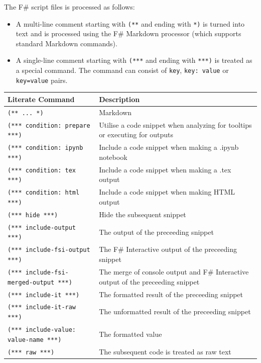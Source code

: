 \documentclass{article}
\begin{document}
The F\# script files is processed as follows:
\begin{itemize}
\item 

A multi-line comment starting with \texttt{(**} and ending with \texttt{*)} is
turned into text and is processed using the F\# Markdown processor
(which supports standard Markdown commands).

\item 

A single-line comment starting with \texttt{(***} and ending with \texttt{***)}
is treated as a special command. The command can consist of
\texttt{key}, \texttt{key: value} or \texttt{key=value} pairs.

\end{itemize}

\begin{tabular}{|l|l|}\hline
\textbf{Literate Command} & \textbf{Description}\\ \hline\hline
\texttt{(** ... *)} & Markdown\\ \hline
\texttt{(*** condition: prepare ***)} & Utilise a code snippet when analyzing for tooltips or executing for outputs\\ \hline
\texttt{(*** condition: ipynb ***)} & Include a code snippet when making a .ipynb notebook\\ \hline
\texttt{(*** condition: tex ***)} & Include a code snippet when making a .tex output\\ \hline
\texttt{(*** condition: html ***)} & Include a code snippet when making HTML output\\ \hline
\texttt{(*** hide ***)} & Hide the subsequent snippet\\ \hline
\texttt{(*** include-output ***)} & The output of the preceeding snippet\\ \hline
\texttt{(*** include-fsi-output ***)} & The F\# Interactive output of the preceeding snippet\\ \hline
\texttt{(*** include-fsi-merged-output ***)} & The merge of console output and F\# Interactive output of the preceeding snippet\\ \hline
\texttt{(*** include-it ***)} & The formatted result of the preceeding snippet\\ \hline
\texttt{(*** include-it-raw ***)} & The unformatted result of the preceeding snippet\\ \hline
\texttt{(*** include-value: value-name ***)} & The formatted value\\ \hline
\texttt{(*** raw ***)} & The subsequent code is treated as raw text\\ \hline
\end{tabular}
\end{document}
